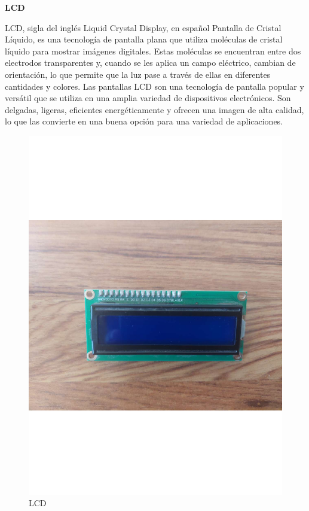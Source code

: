 \textbf{LCD}

LCD, sigla del inglés Liquid Crystal Display, en español Pantalla de Cristal Líquido, es una tecnología de pantalla plana que utiliza moléculas de cristal líquido para mostrar imágenes digitales. Estas moléculas se encuentran entre dos electrodos transparentes y, cuando se les aplica un campo eléctrico, cambian de orientación, lo que permite que la luz pase a través de ellas en diferentes cantidades y colores.
\newline
Las pantallas LCD son una tecnología de pantalla popular y versátil que se utiliza en una amplia variedad de dispositivos electrónicos. Son delgadas, ligeras, eficientes energéticamente y ofrecen una imagen de alta calidad, lo que las convierte en una buena opción para una variedad de aplicaciones. \cite{LCD}

\begin{figure}[H]
        \centering
        \includegraphics[trim = {0mm 0mm 0mm 0mm},clip,scale=0.2]{10/Img/lcd.pdf}
        \caption{LCD}
        \label{lcd}
\end{figure}

